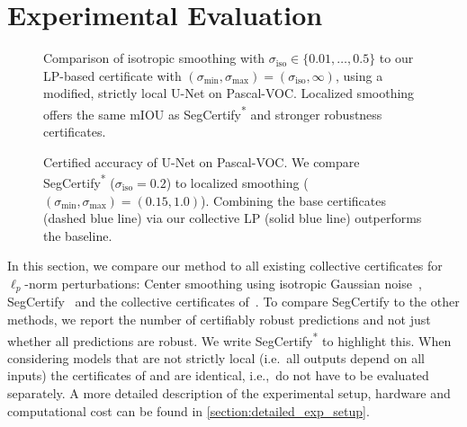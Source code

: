 \documentclass{article} %
\theoremstyle{plain}
\theoremstyle{definition}
\theoremstyle{remark}
\begin{document}
\section{Experimental Evaluation}\label{section:experiments}
\begin{figure}[tp]
	\centering
	\begin{minipage}{0.49\columnwidth}
		\centering
		\resizebox{\textwidth}{!}{}
		\caption{Comparison of isotropic smoothing with $\sigma_\mathrm{iso} \in \{0.01,\dots,0.5\}$ to our LP-based certificate with $\left(\sigma_\mathrm{min},\sigma_\mathrm{max}\right) = (\sigma_\mathrm{iso}, \infty)$, using a modified, strictly local U-Net on Pascal-VOC.
			Localized smoothing offers the same mIOU as SegCertify\textsuperscript{*} and stronger robustness certificates.
		}
		\label{fig:pascal_iou_vs_avg_radius_masked}
	\end{minipage}
	\hfill
	\begin{minipage}{0.49\columnwidth}
		\centering
		\resizebox{\textwidth}{!}{}
		\caption{Certified accuracy of U-Net on Pascal-VOC. We compare SegCertify\textsuperscript{*}  %
			($\sigma_\mathrm{iso}=0.2$) to localized smoothing   
			($\left(\sigma_\mathrm{min},\sigma_\mathrm{max}\right) = (0.15, 1.0)$).
			Combining the base certificates (dashed blue line) via our collective LP (solid blue line) outperforms the baseline.
		}
		\label{fig:pascal_collective_lp}
	\end{minipage}
	\vskip -0.2in
\end{figure}
In this section, we compare our method to all existing collective certificates for $\ell_p$-norm perturbations:
Center smoothing using isotropic Gaussian noise~\citep{Kumar2021}, 
SegCertify~\citep{Fischer2021} 
and the collective certificates of~\citet{Schuchardt2021}. 
To compare SegCertify to the other methods, we report the number of certifiably robust predictions and not just whether all predictions are robust.
We write SegCertify\textsuperscript{*} to highlight this.
When considering models that are not strictly local (i.e.\ all outputs depend on all inputs)
the certificates of \citet{Schuchardt2021} and \citet{Fischer2021} are identical, i.e.,~do not have to be evaluated separately.
A more detailed description of the experimental setup, hardware and computational cost can be found in \autoref{section:detailed_exp_setup}.
\end{document}
